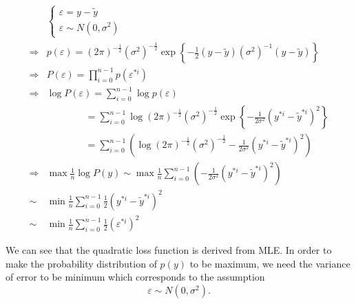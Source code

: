\documentclass[runningheads,openany]{xhlPaper}
\begin{document}
\begin{equation}
\label{equ:lossFunctionSuareLossMLE}
\begin{aligned}
&\left\{ {\begin{array}{*{20}{c}}
{\varepsilon  = y - \tilde y}\\
{\varepsilon  \sim N\left( {0,{\sigma ^2}} \right)}
\end{array}} \right.\\
 \Rightarrow &p\left( \varepsilon  \right) = {\left( {2\pi } \right)^{ - \frac{1}{2}}}{\left( {{\sigma ^2}} \right)^{ - \frac{1}{2}}}\exp \left\{ { - \frac{1}{2}\left( {y - \tilde y} \right){{\left( {{\sigma ^2}} \right)}^{ - 1}}\left( {y - \tilde y} \right)} \right\}\\
 \Rightarrow &P\left( \varepsilon  \right) = \prod\limits_{i = 0}^{n - 1} {p\left( {{\varepsilon ^{*i}}} \right)} \\
 \Rightarrow &\log P\left( \varepsilon  \right) = \sum\limits_{i = 0}^{n - 1} {\log p\left( \varepsilon  \right)} \\
 &\quad\quad\quad\quad= \sum\limits_{i = 0}^{n - 1} {\log {{\left( {2\pi } \right)}^{ - \frac{1}{2}}}{{\left( {{\sigma ^2}} \right)}^{ - \frac{1}{2}}}\exp \left\{ { - \frac{1}{{2{\sigma ^2}}}{{\left( {{y^{*i}} - {{\tilde y}^{*i}}} \right)}^2}} \right\}} \\
 &\quad\quad\quad\quad= \sum\limits_{i = 0}^{n - 1} {\left( {\log {{\left( {2\pi } \right)}^{ - \frac{1}{2}}}{{\left( {{\sigma ^2}} \right)}^{ - \frac{1}{2}}} - \frac{1}{{2{\sigma ^2}}}{{\left( {{y^{*i}} - {{\tilde y}^{*i}}} \right)}^2}} \right)} \\
 \Rightarrow &\max \frac{1}{n}\log P\left( {y} \right) \sim \max \frac{1}{n}\sum\limits_{i = 0}^{n - 1} {\left( { - \frac{1}{{2{\sigma ^2}}}{{\left( {{y^{*i}} - {{\tilde y}^{*i}}} \right)}^2}} \right)}  \\
 \sim &\min \frac{1}{n}\sum\limits_{i = 0}^{n - 1} {\frac{1}{2}{{\left( {{y^{*i}} - {{\tilde y}^{*i}}} \right)}^2}} \\
 \sim &\min \frac{1}{n}\sum\limits_{i = 0}^{n - 1} {\frac{1}{2}{{\left( {{\varepsilon ^{*i}}} \right)}^2}} 
\end{aligned}
\end{equation}

We can see that the quadratic loss function is derived from MLE. In order to make the probability distribution of $p\left(y\right)$ to be maximum, we need the variance of error to be minimum which corresponds to the assumption
\begin{displaymath}
{\varepsilon  \sim N\left( {0,{\sigma ^2}} \right)}.
\end{displaymath}
\end{document}
